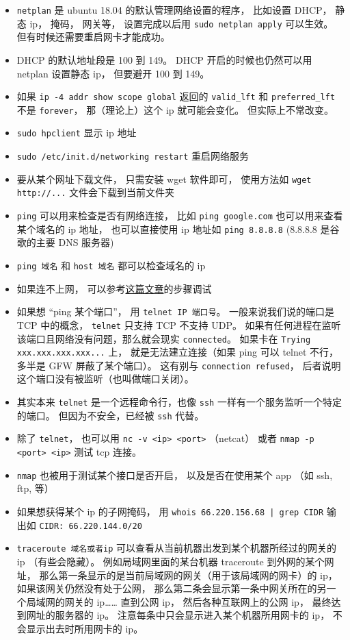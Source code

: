 \begin{itemize}
\item \verb`netplan` 是 ubuntu 18.04 的默认管理网络设置的程序， 比如设置 DHCP， 静态 ip， 掩码， 网关等， 设置完成以后用 \verb`sudo netplan apply` 可以生效。 但有时候还需要重启网卡才能成功。
\item DHCP 的默认地址段是 100 到 149。 DHCP 开启的时候也仍然可以用 netplan 设置静态 ip， 但要避开 100 到 149。
\item 如果 \verb|ip -4 addr show scope global| 返回的 \verb|valid_lft| 和 \verb|preferred_lft| 不是 \verb|forever|， 那（理论上）这个 ip 就可能会变化。 但实际上不常改变。
\item \verb`sudo hpclient` 显示 ip 地址
\item \verb`sudo /etc/init.d/networking restart` 重启网络服务 
\item 要从某个网址下载文件， 只需安装 wget 软件即可， 使用方法如 \verb`wget http://...` 文件会下载到当前文件夹
\item \verb`ping` 可以用来检查是否有网络连接， 比如 \verb`ping google.com` 也可以用来查看某个域名的 ip 地址， 也可以直接使用 ip 地址如 \verb`ping 8.8.8.8` (8.8.8.8 是谷歌的主要 DNS 服务器)
\item \verb`ping 域名` 和 \verb|host 域名| 都可以检查域名的 ip
\item 如果连不上网， 可以参考\href{https://upcloud.com/community/tutorials/troubleshoot-network-connectivity-linux-server/}{这篇文章}的步骤调试
\item 如果想 “ping 某个端口”， 用 \verb|telnet IP 端口号|。 一般来说我们说的端口是 TCP 中的概念， \verb|telnet| 只支持 TCP 不支持 UDP。 如果有任何进程在监听该端口且网络没有问题，那么就会现实 \verb|connected|。 如果卡在 \verb|Trying xxx.xxx.xxx.xxx...| 上， 就是无法建立连接（如果 ping 可以 telnet 不行， 多半是 GFW 屏蔽了某个端口）。 这有别与 \verb|connection refused|， 后者说明这个端口没有被监听（也叫做端口关闭）。
\item 其实本来 \verb|telnet| 是一个远程命令行，也像 \verb|ssh| 一样有一个服务监听一个特定的端口。 但因为不安全，已经被 \verb|ssh| 代替。
\item 除了 \verb|telnet|， 也可以用 \verb|nc -v <ip> <port>| （netcat） 或者 \verb|nmap -p <port> <ip>| 测试 tcp 连接。
\item \verb|nmap| 也被用于测试某个接口是否开启， 以及是否在使用某个 app （如 ssh, ftp, 等）
\item 如果想获得某个 ip 的子网掩码， 用 \verb`whois 66.220.156.68 | grep CIDR` 输出如 \verb|CIDR: 66.220.144.0/20|
\item \verb|traceroute 域名或者ip| 可以查看从当前机器出发到某个机器所经过的网关的 ip （有些会隐藏）。 例如局域网里面的某台机器 traceroute 到外网的某个网址， 那么第一条显示的是当前局域网的网关（用于该局域网的网卡）的 ip， 如果该网关仍然没有处于公网， 那么第二条会显示第一条中网关所在的另一个局域网的网关的 ip…… 直到公网 ip， 然后各种互联网上的公网 ip， 最终达到网址的服务器的 ip。 注意每条中只会显示进入某个机器所用网卡的 ip， 不会显示出去时所用网卡的 ip。

\end{itemize}
